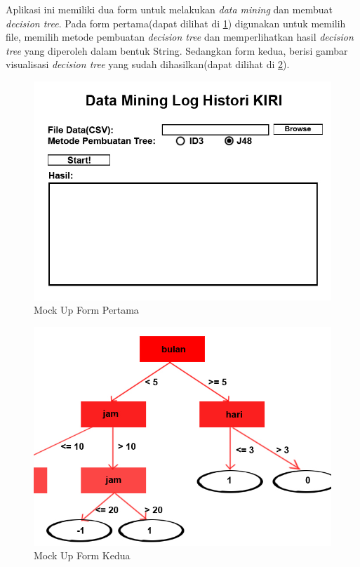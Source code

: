 Aplikasi ini memiliki dua form untuk melakukan \textsl{data mining} dan membuat \textsl{decision tree}. Pada form pertama(dapat dilihat di \ref{fig:MU1}) digunakan untuk memilih file, memilih metode pembuatan \textsl{decision tree} dan memperlihatkan hasil \textsl{decision tree} yang diperoleh dalam bentuk String. Sedangkan form kedua, berisi gambar visualisasi \textsl{decision tree} yang sudah dihasilkan(dapat dilihat di \ref{fig:MU2}).
\begin{figure}[H]
\centering
\includegraphics[scale=1.2]{Gambar/mockUp1.jpg}
\caption[Mock Up Form Pertama]{Mock Up Form Pertama} 
\label{fig:MU1}
\end{figure}

\begin{figure}[H]
\centering
\includegraphics[scale=1.2]{Gambar/mockUp2.jpg}
\caption[Mock Up Form Kedua]{Mock Up Form Kedua} 
\label{fig:MU2}
\end{figure}